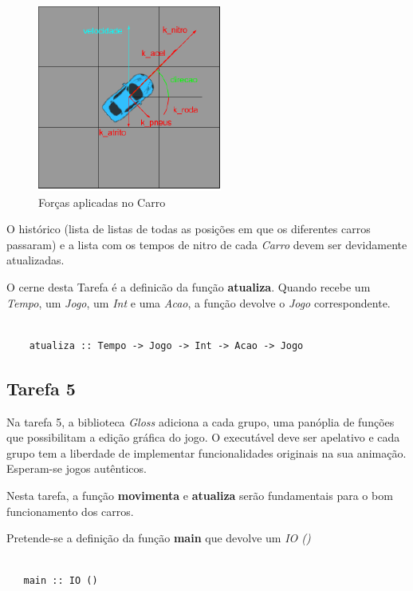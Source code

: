 \documentclass[a4paper]{report} %
\begin{document}
\begin{figure} [!h]
    
    \centering
    \includegraphics[scale = 1.2]{Imagens/forcas.png}
    \caption{Forças aplicadas no Carro}

\end{figure}

O histórico (lista de listas de todas as posições em que os diferentes carros passaram) e a lista com os tempos de nitro de cada \emph{Carro} devem ser devidamente atualizadas. 

O cerne desta Tarefa é a definicão da função \textbf{atualiza}. Quando recebe um \emph{Tempo}, um \emph{Jogo}, um \emph{Int} e uma \emph{Acao}, a função devolve o \emph{Jogo} correspondente.

\begin{verbatim}
    
    atualiza :: Tempo -> Jogo -> Int -> Acao -> Jogo

\end{verbatim}

\newpage

 \subsection{Tarefa 5}

Na tarefa 5, a biblioteca \textit{Gloss} adiciona a cada grupo, uma panóplia de funções que possibilitam a edição gráfica do jogo. O executável deve ser apelativo e cada grupo tem a liberdade de implementar funcionalidades originais na sua animação. Esperam-se jogos autênticos. 

Nesta tarefa, a função \textbf{movimenta} e \textbf{atualiza} serão fundamentais para o bom funcionamento dos carros.

Pretende-se a definição da função \textbf{main} que devolve um \emph{IO ()}

\begin{verbatim}
  
   main :: IO ()

\end{verbatim}
\end{document}
